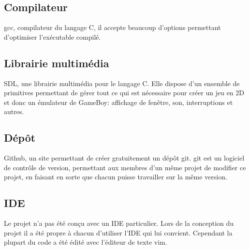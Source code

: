 \documentclass{report}
\begin{document}
\subsection{Compilateur}
gcc, compilateur du langage C, il accepte beaucoup d'options permettant d'optimiser l'exécutable compilé.

\subsection{Librairie multimédia}
SDL, une librairie multimédia pour le langage C. Elle dispose d'un ensemble de primitives permettant de gérer tout ce qui est nécessaire pour créer un jeu en 2D et donc un émulateur de GameBoy: affichage de fenêtre, son, interruptions et autres.

\subsection{Dépôt}
Github, un site permettant de créer gratuitement un dépôt git. git est un logiciel de contrôle de version, permettant aux membres d'un même projet de modifier ce projet, en faisant en sorte que chacun puisse travailler sur la même version.

\subsection{IDE}
Le projet n'a pas été conçu avec un IDE particulier. Lors de la conception du projet il a été propre à chacun d'utiliser l'IDE qui lui convient. Cependant la plupart du code a été édité avec l'éditeur de texte vim.
\end{document}
